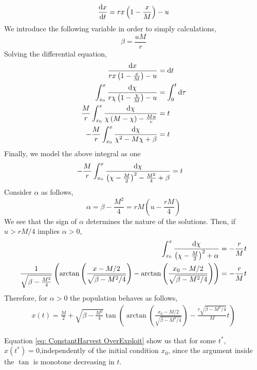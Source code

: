 \begin{equation}
\frac{\mathrm{d} x}{{\mathrm{d} t}}=rx\left(1-\frac{x}{M}\right)-u \label{eq: ConstantHarvest}
\end{equation}
We introduce the following variable in order to simply calculations,
\begin{equation}
\beta=\frac{uM}{r}
\end{equation}
Solving the differential equation,
\begin{align*}
	\frac{\mathrm{d} x}{rx\left(1-\frac{x}{M}\right)-u}&=\mathrm{d} t \\
	\int_{x_0}^{x}\frac{\mathrm{d} \chi}{r\chi\left(1-\frac{\chi}{M}\right)-u}&=\int_{0}^{t}\mathrm{d} \tau \\
	\frac{M}{r}\int_{x_0}^{x}\frac{\mathrm{d} \chi}{\chi\left(M-\chi\right)-\frac{Mu}{r}}&=t \\
	-\frac{M}{r}\int_{x_0}^{x}\frac{\mathrm{d} \chi}{\chi^2-M\chi+\beta}&=t \nonumber
	\end{align*}
Finally, we model the above integral as one 
\begin{align}
	-\frac{M}{r}\int_{x_0}^{x}\frac{\mathrm{d} \chi}{\left(\chi-\frac{M}{2}\right)^2-\frac{M^2}{4}+\beta}&=t
\end{align}
Consider $\alpha$ as follows,
\begin{equation}
	\alpha = \beta - \frac{M^2}{4} = rM\left(u-\frac{rM}{4}\right)
\end{equation}
We see that the sign of $\alpha$ determines the nature of the solutions. Then, if $u>rM/4$ implies $\alpha>0$,
\begin{align*}
\int_{x_0}^{x}\frac{\mathrm{d} \chi}{\left(\chi-\frac{M}{2}\right)^2+\alpha}&=-\frac{r}{M}t \\
\frac{1}{\sqrt{\beta-\frac{M^2}{4}}}\left(\arctan\left(\frac{x-M/2}{\sqrt{\beta-M^2/4}}\right)-\arctan\left(\frac{x_0-M/2}{\sqrt{\beta-M^2/4}}\right)\right)&=-\frac{r}{M}t \\
\end{align*}
Therefore, for $\alpha > 0$ the population behaves as follows, 
\begin{align}
	x(t)=\frac{M}{2}+\sqrt{\beta-\frac{M^2}{4}} \tan \left(\arctan\left(\frac{x_0-M/2}{\sqrt{\beta-M^2/4}}\right)-\frac{r\sqrt{\beta-M^2/4}}{M}t\right) \label{eq: ConstantHarvest OverExploit}
\end{align}

Equation \ref{eq: ConstantHarvest OverExploit} show us that for some $t^*$, $x(t^*)=0$,independently of the initial condition $x_0$, since the argument inside the $\tan$ is monotone decreasing in $t$. 

